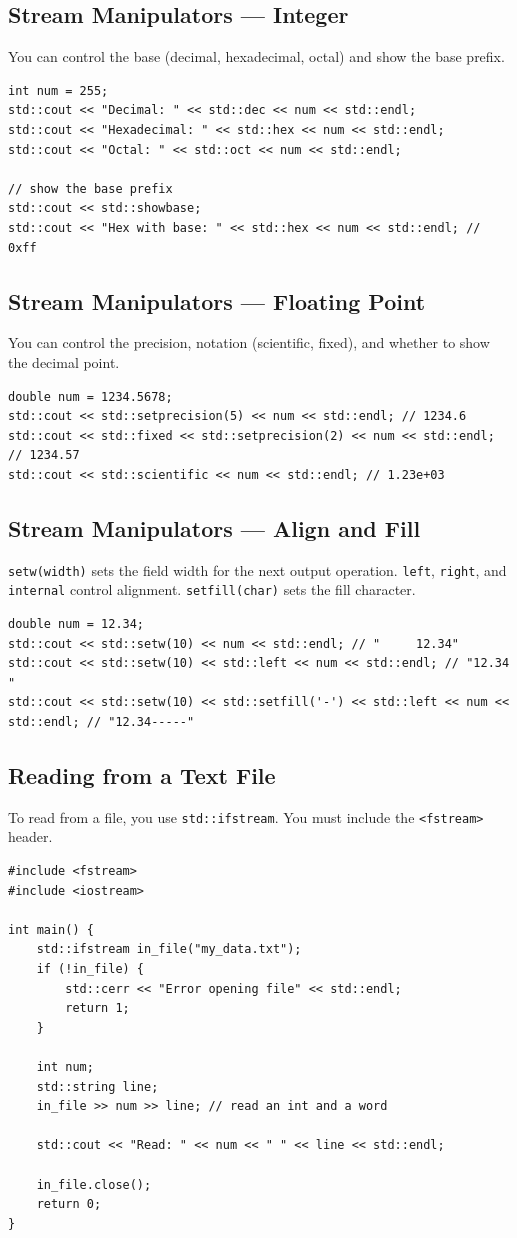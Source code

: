 \subsection{Stream Manipulators --- Integer}
You can control the base (decimal, hexadecimal, octal) and show the base prefix.
\begin{lstlisting}
int num = 255;
std::cout << "Decimal: " << std::dec << num << std::endl;
std::cout << "Hexadecimal: " << std::hex << num << std::endl;
std::cout << "Octal: " << std::oct << num << std::endl;

// show the base prefix
std::cout << std::showbase;
std::cout << "Hex with base: " << std::hex << num << std::endl; // 0xff
\end{lstlisting}

\subsection{Stream Manipulators --- Floating Point}
You can control the precision, notation (scientific, fixed), and whether to show the decimal point.
\begin{lstlisting}
double num = 1234.5678;
std::cout << std::setprecision(5) << num << std::endl; // 1234.6
std::cout << std::fixed << std::setprecision(2) << num << std::endl; // 1234.57
std::cout << std::scientific << num << std::endl; // 1.23e+03
\end{lstlisting}

\subsection{Stream Manipulators --- Align and Fill}
\texttt{setw(width)} sets the field width for the next output operation. \texttt{left}, \texttt{right}, and \texttt{internal} control alignment. \texttt{setfill(char)} sets the fill character.
\begin{lstlisting}
double num = 12.34;
std::cout << std::setw(10) << num << std::endl; // "     12.34"
std::cout << std::setw(10) << std::left << num << std::endl; // "12.34     "
std::cout << std::setw(10) << std::setfill('-') << std::left << num << std::endl; // "12.34-----"
\end{lstlisting}

\subsection{Reading from a Text File}
To read from a file, you use \texttt{std::ifstream}. You must include the \texttt{<fstream>} header.
\begin{lstlisting}
#include <fstream>
#include <iostream>

int main() {
	std::ifstream in_file("my_data.txt");
	if (!in_file) {
		std::cerr << "Error opening file" << std::endl;
		return 1;
	}

	int num;
	std::string line;
	in_file >> num >> line; // read an int and a word

	std::cout << "Read: " << num << " " << line << std::endl;

	in_file.close();
	return 0;
}
\end{lstlisting}

